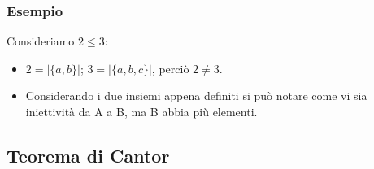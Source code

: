 \documentclass[12pt]{article}
\begin{document}
\subsubsection{Esempio}
Consideriamo $2 \leq 3$:
\begin{itemize}
    \item $2 = |\{a, b\}|$; $3 = |\{a, b, c\}|$, perciò $2 \neq 3$.
    \item Considerando i due insiemi appena definiti si può notare come vi sia iniettività da A a B, ma B abbia più elementi.
\end{itemize}
\subsection{Teorema di Cantor}
\end{document}
